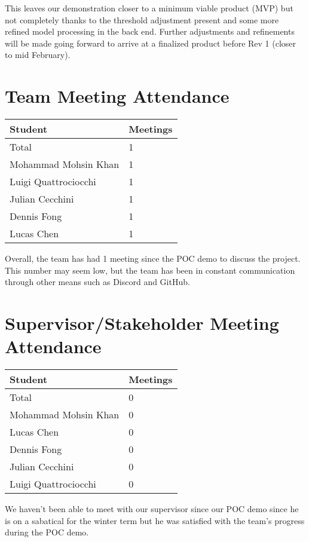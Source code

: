 \documentclass{article}
\begin{document}
This leaves our demonstration closer to a minimum viable product (MVP) but not completely thanks to
the threshold adjustment present and some more refined model processing in the back end. Further adjustments 
and refinements will be made going forward to arrive at a finalized product before Rev 1 (closer to mid February).


\section{Team Meeting Attendance}

\begin{table}[H]
\centering
\begin{tabular}{ll}
\toprule
\textbf{Student} & \textbf{Meetings}\\
\midrule
Total & 1\\
Mohammad Mohsin Khan & 1\\
Luigi Quattrociocchi & 1\\
Julian Cecchini & 1\\
Dennis Fong & 1\\
Lucas Chen & 1\\
\bottomrule
\end{tabular}
\end{table}

Overall, the team has had 1 meeting since the POC demo to discuss the project. This number may seem low, but the team has been in constant communication through other means such as Discord and GitHub.

\section{Supervisor/Stakeholder Meeting Attendance}

\begin{table}[H]
\centering
\begin{tabular}{ll}
\toprule
\textbf{Student} & \textbf{Meetings}\\
\midrule
Total & 0\\
Mohammad Mohsin Khan & 0\\
Lucas Chen & 0\\
Dennis Fong & 0\\
Julian Cecchini & 0\\
Luigi Quattrociocchi & 0\\
\bottomrule
\end{tabular}
\end{table}

We haven't been able to meet with our supervisor since our POC demo since he is on a sabatical for the winter term but he was satisfied with the team's progress during the POC demo.
\end{document}
